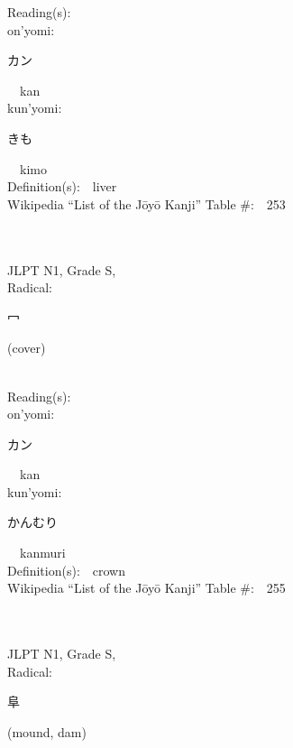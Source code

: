 \begin{multicols}{2}
Reading(s):\ \ \\
{\hspace*{1em}}on'yomi:\ \ \\
{\hspace*{2em}}{\begin{CJK}{UTF8}{min} カン \end{CJK}}\ \ kan\ \ \\
{\hspace*{1em}}kun'yomi:\ \ \\
{\hspace*{2em}}{\begin{CJK}{UTF8}{min} きも \end{CJK}}\ \ kimo\ \ \\
Definition(s):\ \ liver \\
Wikipedia ``List of the J\=oy\=o Kanji'' Table \#:\ \ 253 \\
\ \ \\
{\fontsize{34pt}{40pt}  }\ \ \\
{JLPT N1, Grade S, \\Radical:\ \ {\begin{CJK}{UTF8}{min} 冖 \end{CJK}} (cover) } \\
Reading(s):\ \ \\
{\hspace*{1em}}on'yomi:\ \ \\
{\hspace*{2em}}{\begin{CJK}{UTF8}{min} カン \end{CJK}}\ \ kan\ \ \\
{\hspace*{1em}}kun'yomi:\ \ \\
{\hspace*{2em}}{\begin{CJK}{UTF8}{min} かんむり \end{CJK}}\ \ kanmuri\ \ \\
Definition(s):\ \ crown \\
Wikipedia ``List of the J\=oy\=o Kanji'' Table \#:\ \ 255 \\
\ \ \\
{\fontsize{34pt}{40pt}  }\ \ \\
{JLPT N1, Grade S, \\Radical:\ \ {\begin{CJK}{UTF8}{min} 阜 \end{CJK}} (mound, dam) } \\

\end{multicols}
